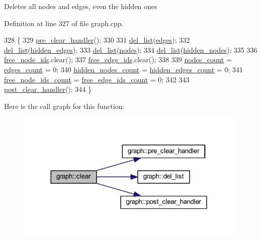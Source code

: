 Deletes all nodes and edges, even the hidden ones 

Definition at line 327 of file graph.\+cpp.


\begin{DoxyCode}
328 \{
329     \mbox{\hyperlink{classgraph_a16ccad78837d16be59854549cd2d847a}{pre\_clear\_handler}}();
330 
331     \mbox{\hyperlink{classgraph_a23f0a5fb311b7d71bb9dfc4e8aedef35}{del\_list}}(\mbox{\hyperlink{classgraph_ab5b1c610cca1bcf72b05aacc28a48153}{edges}});
332     \mbox{\hyperlink{classgraph_a23f0a5fb311b7d71bb9dfc4e8aedef35}{del\_list}}(\mbox{\hyperlink{classgraph_a0d3da33d047ba7cdc3dc68b5d9c84b88}{hidden\_edges}});
333     \mbox{\hyperlink{classgraph_a23f0a5fb311b7d71bb9dfc4e8aedef35}{del\_list}}(\mbox{\hyperlink{classgraph_a4ea0592e8eb7c26c5abad24546907726}{nodes}});
334     \mbox{\hyperlink{classgraph_a23f0a5fb311b7d71bb9dfc4e8aedef35}{del\_list}}(\mbox{\hyperlink{classgraph_a7a3f2842a409a4b35ca8ef34598df9ca}{hidden\_nodes}});
335 
336     \mbox{\hyperlink{classgraph_ae3f535853434924927a21d7725445aab}{free\_node\_ids}}.clear();
337     \mbox{\hyperlink{classgraph_a2bef57ea1db5b5541b3cce866de179f0}{free\_edge\_ids}}.clear();
338 
339     \mbox{\hyperlink{classgraph_a1f59223d0bcf647920963d7a661dd74a}{nodes\_count}} = \mbox{\hyperlink{classgraph_af560ff4263ad165c166a46084e781b4a}{edges\_count}} = 0;
340     \mbox{\hyperlink{classgraph_aa72548d972d226a69f7f8fb92b363860}{hidden\_nodes\_count}} = \mbox{\hyperlink{classgraph_a3151f544e049fbd985204ca9d8f74c97}{hidden\_edges\_count}} = 0;
341     \mbox{\hyperlink{classgraph_a9480e2310fe64c3a8ad295bb3f119772}{free\_node\_ids\_count}} = \mbox{\hyperlink{classgraph_a336be547b5e0ca43b96cf00131e0e1da}{free\_edge\_ids\_count}} = 0;
342     
343     \mbox{\hyperlink{classgraph_a870633528590b7925cd27776bdd2bbd2}{post\_clear\_handler}}();
344 \}
\end{DoxyCode}
Here is the call graph for this function\+:\nopagebreak
\begin{figure}[H]
\begin{center}
\leavevmode
\includegraphics[width=312pt]{classgraph_a9ff5d6af3653e79f87b836701453f55a_cgraph}
\end{center}
\end{figure}
